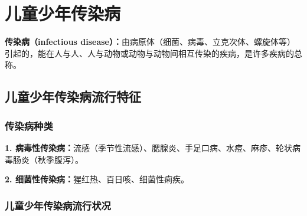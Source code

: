 \chapter{儿童少年传染病}
\setcounter{chapter}{9}

\begin{defbox}
\textbf{传染病（infectious disease）：}由病原体（细菌、病毒、立克次体、螺旋体等）引起的，能在人与人、人与动物或动物与动物间相互传染的疾病，是许多疾病的总称。
\end{defbox}

\section{儿童少年传染病流行特征}

\subsection{传染病种类}

\begin{keybox}
\textbf{1. 病毒性传染病：}流感（季节性流感）、腮腺炎、手足口病、水痘、麻疹、轮状病毒肠炎（秋季腹泻）。

\textbf{2. 细菌性传染病：}猩红热、百日咳、细菌性痢疾。
\end{keybox}

\subsection{儿童少年传染病流行状况}


